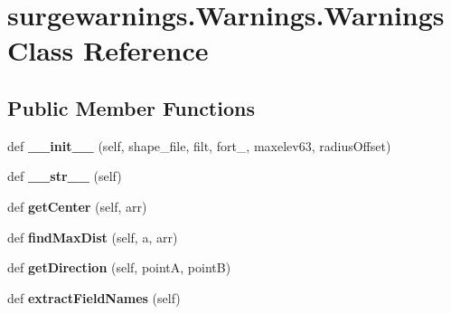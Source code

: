 \hypertarget{classsurgewarnings_1_1_warnings_1_1_warnings}{}\section{surgewarnings.\+Warnings.\+Warnings Class Reference}
\label{classsurgewarnings_1_1_warnings_1_1_warnings}
\subsection*{Public Member Functions}
\begin{DoxyCompactItemize}
\item 
\hypertarget{classsurgewarnings_1_1_warnings_1_1_warnings_a5e305a0f2418cf2d99a39ae3d1830193}{}def {\bfseries \+\_\+\+\_\+init\+\_\+\+\_\+} (self, shape\+\_\+file, filt, fort\+\_, maxelev63, radius\+Offset)\label{classsurgewarnings_1_1_warnings_1_1_warnings_a5e305a0f2418cf2d99a39ae3d1830193}

\item 
\hypertarget{classsurgewarnings_1_1_warnings_1_1_warnings_a3d092c504d25df4c7e29ba757cc4ab1b}{}def {\bfseries \+\_\+\+\_\+str\+\_\+\+\_\+} (self)\label{classsurgewarnings_1_1_warnings_1_1_warnings_a3d092c504d25df4c7e29ba757cc4ab1b}

\item 
\hypertarget{classsurgewarnings_1_1_warnings_1_1_warnings_a5301ca1b4d4e567f15e8889996b16ce4}{}def {\bfseries get\+Center} (self, arr)\label{classsurgewarnings_1_1_warnings_1_1_warnings_a5301ca1b4d4e567f15e8889996b16ce4}

\item 
\hypertarget{classsurgewarnings_1_1_warnings_1_1_warnings_ab5989dc682527f14309b1f6dd0f03e2d}{}def {\bfseries find\+Max\+Dist} (self, a, arr)\label{classsurgewarnings_1_1_warnings_1_1_warnings_ab5989dc682527f14309b1f6dd0f03e2d}

\item 
\hypertarget{classsurgewarnings_1_1_warnings_1_1_warnings_a3397218da9f31f145c9c03f46a0261e7}{}def {\bfseries get\+Direction} (self, point\+A, point\+B)\label{classsurgewarnings_1_1_warnings_1_1_warnings_a3397218da9f31f145c9c03f46a0261e7}

\item 
\hypertarget{classsurgewarnings_1_1_warnings_1_1_warnings_a4fb2d77637f3b3806923fcc4f7eeb325}{}def {\bfseries extract\+Field\+Names} (self)\label{classsurgewarnings_1_1_warnings_1_1_warnings_a4fb2d77637f3b3806923fcc4f7eeb325}


\end{DoxyCompactItemize}
